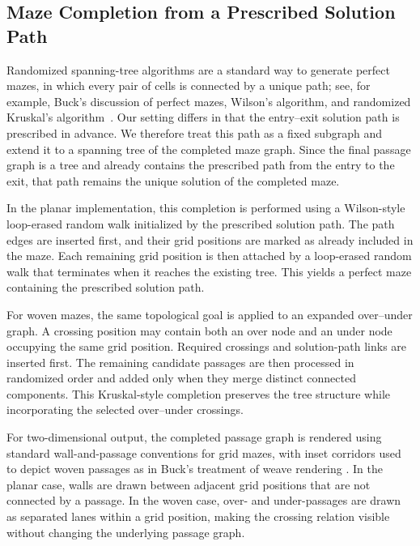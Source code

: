 \documentclass[acmsmall,screen,nonacm]{acmart}
\begin{document}
\subsection{Maze Completion from a Prescribed Solution Path}

Randomized spanning-tree algorithms are a standard way to generate
perfect mazes, in which every pair of cells is connected by a unique
path; see, for example, Buck's discussion of perfect mazes, Wilson's
algorithm, and randomized Kruskal's algorithm~\cite[Chs.~1, 4,
  and~10]{Buck2015MazesForProgrammers}.  Our setting differs in that
the entry--exit solution path is prescribed in advance. We therefore
treat this path as a fixed subgraph and extend it to a spanning tree
of the completed maze graph. Since the final passage graph is a tree
and already contains the prescribed path from the entry to the exit,
that path remains the unique solution of the completed maze.

In the planar implementation, this completion is performed using a
Wilson-style loop-erased random walk initialized by the prescribed
solution path. The path edges are inserted first, and their grid
positions are marked as already included in the maze. Each remaining
grid position is then attached by a loop-erased random walk that
terminates when it reaches the existing tree. This yields a perfect
maze containing the prescribed solution path.

For woven mazes, the same topological goal is applied to an expanded
over--under graph. A crossing position may contain both an over node
and an under node occupying the same grid position. Required crossings
and solution-path links are inserted first. The remaining candidate
passages are then processed in randomized order and added only when
they merge distinct connected components. This Kruskal-style
completion preserves the tree structure while incorporating the
selected over--under crossings.

For two-dimensional output, the completed passage graph is rendered
using standard wall-and-passage conventions for grid mazes, with inset
corridors used to depict woven passages as in Buck's treatment of
weave rendering \cite[Chs.~2 and~9]{Buck2015MazesForProgrammers}. In
the planar case, walls are drawn between adjacent grid positions that
are not connected by a passage. In the woven case, over- and
under-passages are drawn as separated lanes within a grid position,
making the crossing relation visible without changing the underlying
passage graph.
\end{document}
